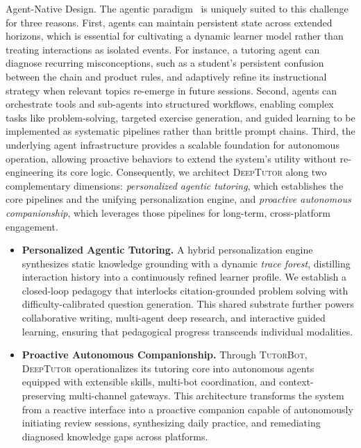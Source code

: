 Agent-Native Design. The agentic paradigm~\citep{yao2023reactsynergizingreasoningacting,wang2024survey} is uniquely suited to this challenge for three reasons.
First, agents can maintain persistent state across extended horizons, which is essential for cultivating a dynamic learner model rather than treating interactions as isolated events.
For instance, a tutoring agent can diagnose recurring misconceptions, such as a student's persistent confusion between the chain and product rules, and adaptively refine its instructional strategy when relevant topics re-emerge in future sessions.
Second, agents can orchestrate tools and sub-agents into structured workflows, enabling complex tasks like problem-solving, targeted exercise generation, and guided learning to be implemented as systematic pipelines rather than brittle prompt chains.
Third, the underlying agent infrastructure provides a scalable foundation for autonomous operation, allowing proactive behaviors to extend the system’s utility without re-engineering its core logic.
Consequently, we architect \textsc{DeepTutor} along two complementary dimensions: \emph{personalized agentic tutoring}, which establishes the core pipelines and the unifying personalization engine, and \emph{proactive autonomous companionship}, which leverages those pipelines for long-term, cross-platform engagement.
\begin{itemize}[leftmargin=*]
\item \textbf{Personalized Agentic Tutoring.}\quad
A hybrid personalization engine synthesizes static knowledge grounding with a dynamic \emph{trace forest}, distilling interaction history into a continuously refined learner profile.
We establish a closed-loop pedagogy that interlocks citation-grounded problem solving with difficulty-calibrated question generation. This shared substrate further powers collaborative writing, multi-agent deep research, and interactive guided learning, ensuring that pedagogical progress transcends individual modalities.

\item \textbf{Proactive Autonomous Companionship.}\quad
Through \textsc{TutorBot}, \textsc{DeepTutor} operationalizes its tutoring core into autonomous agents equipped with extensible skills, multi-bot coordination, and context-preserving multi-channel gateways.
This architecture transforms the system from a reactive interface into a proactive companion capable of autonomously initiating review sessions, synthesizing daily practice, and remediating diagnosed knowledge gaps across platforms.
\end{itemize}

